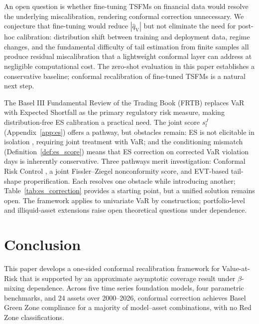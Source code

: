 \documentclass[preprint,11pt,authoryear]{elsarticle}
\newcommand{\1}{\boldsymbol{1}}
\newcommand{\qV}{\hat{q}_{\scriptscriptstyle\mathrm{V}}}
\begin{document}
	An open question is whether fine-tuning TSFMs on financial
	data would resolve the underlying miscalibration, rendering
	conformal correction unnecessary. We conjecture that
	fine-tuning would reduce $|\qV|$ but not eliminate the need
	for post-hoc calibration: distribution shift between training
	and deployment data, regime changes, and the fundamental
	difficulty of tail estimation from finite samples all produce
	residual miscalibration that a lightweight conformal layer can
	address at negligible computational cost. The zero-shot
	evaluation in this paper establishes a conservative baseline;
	conformal recalibration of fine-tuned TSFMs is a natural next
	step.
	
	The Basel III Fundamental Review of the Trading Book (FRTB) replaces VaR with Expected Shortfall as the primary regulatory risk measure, making distribution-free ES calibration a practical need. The joint score $s^J_t$ (Appendix~\ref{app:es}) offers a pathway, but obstacles remain: ES is not elicitable in isolation \citep{gneiting2011making}, requiring joint treatment with VaR; and the conditioning mismatch (Definition~\ref{def:es_score}) means that ES correction on corrected VaR violation days is inherently conservative. Three pathways merit investigation: Conformal Risk Control \citep{angelopoulos2024conformal}, a joint Fissler--Ziegel nonconformity score, and EVT-based tail-shape properification. Each resolves one obstacle while introducing another; Table~\ref{tab:es_correction} provides a starting point, but a unified solution remains open. The framework applies to univariate VaR by construction; portfolio-level and illiquid-asset extensions raise open theoretical questions under dependence.
	
	\section{Conclusion}
	\label{sec:conclude}
	
	This paper develops a one-sided conformal recalibration framework for Value-at-Risk that is supported by an approximate asymptotic coverage result under $\beta$-mixing dependence. Across five time series foundation models, four parametric benchmarks, and 24 assets over 2000--2026, conformal correction achieves Basel Green Zone compliance for a majority of model--asset combinations, with no Red Zone classifications.
\end{document}

